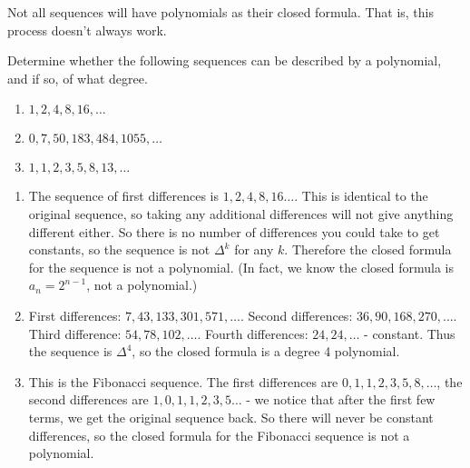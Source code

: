\documentclass[12pt]{article}
\begin{document}
Not all sequences will have polynomials as their closed formula.  That is, this process doesn't always work.

\begin{example}
  Determine whether the following sequences can be described by a polynomial, and if so, of what degree.
  \begin{enumerate}
    \item $1, 2, 4, 8, 16, \ldots$
    \item $0, 7, 50, 183, 484, 1055, \ldots$
    \item $1,1,2,3,5,8,13,\ldots$
  \end{enumerate}
\begin{solution}
  \begin{enumerate}
    \item The sequence of first differences is $1, 2, 4, 8, 16\ldots$.  This is identical to the original sequence, so taking any additional differences will not give anything different either.  So there is no number of differences you could take to get constants, so the sequence is not $\Delta^k$ for any $k$.  Therefore the closed formula for the sequence is not a polynomial.  (In fact, we know the closed formula is $a_n = 2^{n-1}$, not a polynomial.)
    \item First differences: $7, 43, 133, 301, 571,\ldots$.  Second differences: $36, 90, 168, 270,\ldots$.  Third difference: $54, 78, 102,\ldots$.  Fourth differences: $24, 24, \ldots$ - constant.  Thus the sequence is $\Delta^4$, so the closed formula is a degree 4 polynomial.
    \item This is the Fibonacci sequence.  The first differences are $0, 1, 1, 2, 3, 5, 8, \ldots$, the second differences are $1, 0, 1, 1, 2, 3,5\ldots$ - we notice that after the first few terms, we get the original sequence back.  So there will never be constant differences, so the closed formula for the Fibonacci sequence is not a polynomial.
  \end{enumerate}

\end{solution}

\end{example}
\end{document}
